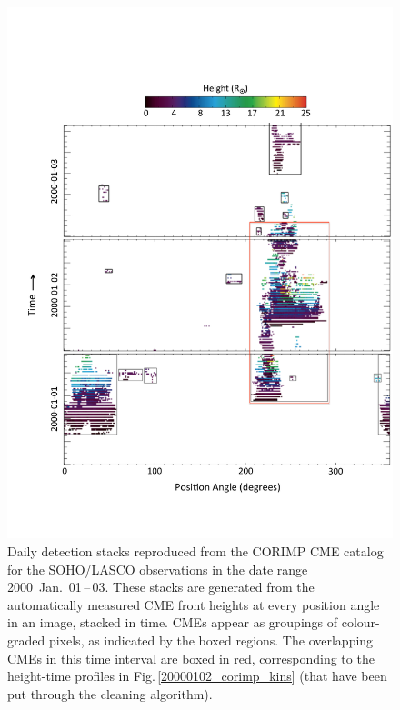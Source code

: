 \documentclass[referee,a4paper,12pt,traditabstract]{swsc}
\begin{document}
\begin{linenumbers}
\begin{figure}[t]
\centerline{\includegraphics[scale=0.5, trim=20 70 0 140, clip=true]{images/pa_total.pdf}}
\caption{Daily detection stacks reproduced from the CORIMP CME catalog for the SOHO/LASCO observations in the date range 2000~Jan.~01\,--\,03. These stacks are generated from the automatically measured CME front heights at every position angle in an image, stacked in time. CMEs appear as groupings of colour-graded pixels, as indicated by the boxed regions. The overlapping CMEs in this time interval are boxed in red, corresponding to the height-time profiles in Fig.\,\ref{20000102_corimp_kins} (that have been put through the cleaning algorithm).}
\label{pa_total}
\end{figure}


\end{linenumbers}
\end{document}
